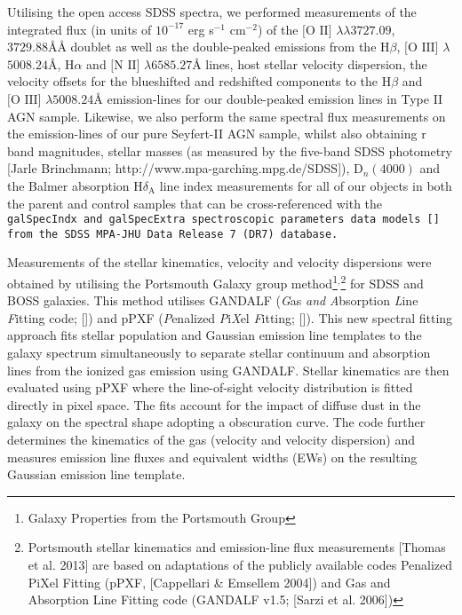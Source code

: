 Utilising the open access SDSS spectra, we performed measurements of the integrated flux (in units of $10^{-17}$ erg s$^{-1}$ cm$^{-2}$) of the $\text{[O II]}$ $\lambda\lambda$$3727.09$, $3729.88ÅÅ$ doublet as well as the double-peaked emissions from the $\text{H}\beta$, $\text{[O III]}$ $\lambda$$5008.24Å$, $\text{H}\alpha$ and $\text{[N II]}$ $\lambda$$6585.27Å$ lines, host stellar velocity dispersion, the velocity offsets for the blueshifted and redshifted components to the $\text{H}\beta$ and $\text{[O III]}$ $\lambda$$5008.24Å$ emission-lines for our double-peaked emission lines in Type II AGN sample. Likewise, we also perform the same spectral flux measurements on the emission-lines of our pure Seyfert-II AGN sample, whilst also obtaining r band magnitudes, stellar masses (as measured by the five-band SDSS photometry [Jarle Brinchmann; http://www.mpa-garching.mpg.de/SDSS]), $\text{D}_{n}(4000)$ and the Balmer absorption $\text{H}\delta_{\text{A}}$ line index measurements for all of our objects in both the parent and control samples that can be cross-referenced with the \tt{galSpecIndx} and \tt{galSpecExtra} spectroscopic parameters data models [\cite{Kauffmann_2004}] from the SDSS MPA-JHU Data Release 7 (DR7) database. 

Measurements of the stellar kinematics, velocity and velocity dispersions were obtained by utilising the Portsmouth Galaxy group method\footnote{\tiny{Galaxy Properties from the Portsmouth Group}}$^{\text{,}}$\footnote{\tiny{Portsmouth stellar kinematics and emission-line flux measurements [Thomas et al. 2013] are based on adaptations of the publicly available codes Penalized PiXel Fitting (pPXF, [Cappellari \& Emsellem 2004]) and Gas and Absorption Line Fitting code (GANDALF v1.5; [Sarzi et al. 2006])}} for SDSS and BOSS galaxies. This method utilises GANDALF (\textit{G}as \textit{and} \textit{A}bsorption \textit{L}ine \textit{F}itting code; [\cite{Sarzi_2006}]) and pPXF (\textit{P}enalized \textit{P}i\textit{X}el \textit{F}itting; [\cite{2012ascl.soft10002C}]). This new spectral fitting approach fits stellar population and Gaussian emission line templates to the galaxy spectrum simultaneously to separate stellar continuum and absorption lines from the ionized gas emission using GANDALF. Stellar kinematics are then evaluated using pPXF where the line-of-sight velocity distribution is fitted directly in pixel space. The fits account for the impact of diffuse dust in the galaxy on the spectral shape adopting a \cite{Calzetti_2001} obscuration curve. The code further determines the kinematics of the gas (velocity and velocity dispersion) and measures emission line fluxes and equivalent widths (EWs) on the resulting Gaussian emission line template.

